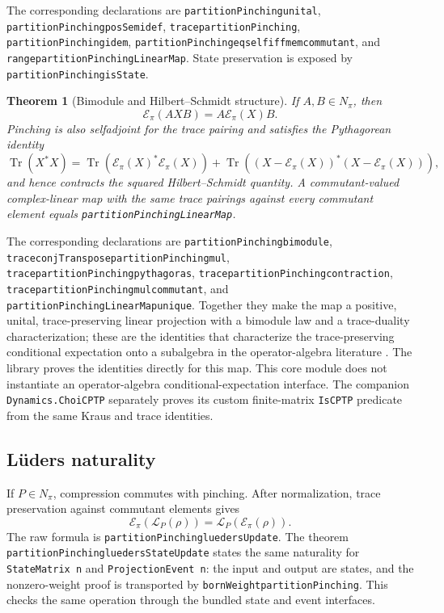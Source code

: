 \documentclass[11pt]{article}
\renewcommand{\_}{\textunderscore\allowbreak}
\newtheorem{theorem}{Theorem}
\theoremstyle{remark}
\newcommand{\Tr}{\operatorname{Tr}}
\newcommand{\pinch}{\mathcal E}
\newcommand{\lued}{\mathcal L}
\begin{document}
The corresponding declarations are
\texttt{partitionPinching\_unital},
\texttt{partitionPinching\_posSemidef},
\texttt{trace\_partitionPinching},
\texttt{partitionPinching\_idem},
\texttt{partitionPinching\_eq\_self\_iff\_mem\_commutant}, and
\texttt{range\_partitionPinchingLinearMap}. State preservation is exposed by
\texttt{partitionPinching\_isState}.

\begin{theorem}[Bimodule and Hilbert--Schmidt structure]
\label{thm:pinching-geometry}
If $A,B\in N_\pi$, then
\[
 \pinch_\pi(AXB)=A\pinch_\pi(X)B.
\]
Pinching is also selfadjoint for the trace pairing and satisfies the
Pythagorean identity
\[
 \Tr(X^*X)=
 \Tr(\pinch_\pi(X)^*\pinch_\pi(X))+
 \Tr((X-\pinch_\pi(X))^*(X-\pinch_\pi(X))),
\]
and hence contracts the squared Hilbert--Schmidt quantity. A
commutant-valued complex-linear map with the same trace pairings against every
commutant element equals
\texttt{partitionPinching\allowbreak LinearMap}.
\end{theorem}

The corresponding declarations are
\texttt{partitionPinching\_bimodule},
\texttt{trace\_conjTranspose\_partitionPinching\_mul},
\texttt{trace\_partitionPinching\_pythagoras},
\texttt{trace\_partitionPinching\_contraction},
\texttt{trace\_partitionPinching\_mul\_commutant}, and
\texttt{partitionPinchingLinearMap\_unique}. Together they make the map a
positive, unital, trace-preserving linear projection with a bimodule law and
a trace-duality characterization; these are the identities that
characterize the trace-preserving conditional expectation onto a subalgebra
in the operator-algebra literature \cite{umegaki1954,takesaki1972}. The
library proves the identities directly for this map. This core module does
not instantiate an operator-algebra conditional-expectation interface. The
companion \texttt{Dynamics.ChoiCPTP} separately proves its custom
finite-matrix \texttt{IsCPTP} predicate from the same Kraus and trace
identities.

\subsection{L\"uders naturality}

If $P\in N_\pi$, compression commutes with pinching. After normalization,
trace preservation against commutant elements gives
\[
 \pinch_\pi(\lued_P(\rho))=
 \lued_P(\pinch_\pi(\rho)).
\]
The raw formula is
\texttt{partitionPinching\_luedersUpdate}. The theorem
\texttt{partitionPinching\_luedersStateUpdate} states the same naturality for
\texttt{StateMatrix n} and \texttt{ProjectionEvent n}: the input and output
are states, and the nonzero-weight proof is transported by
\texttt{bornWeight\_partitionPinching}. This checks the same operation through
the bundled state and event interfaces.
\end{document}
